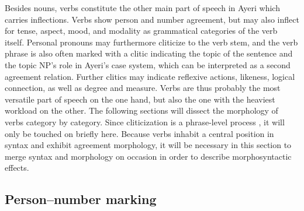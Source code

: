 Besides nouns, verbs constitute the other main part of speech in Ayeri which 
carries inflections. Verbs show person and number agreement, but may also 
inflect for tense, aspect, mood, and modality as grammatical categories of the 
verb itself. Personal pronouns may furthermore cliticize to the verb stem, and 
the verb phrase is also often marked with a clitic indicating the topic of 
the sentence and the topic NP's role in Ayeri's case system, which can be 
interpreted as a second agreement relation. Further clitics may indicate 
reflexive actions, likeness, logical connection, as well as degree and measure. 
Verbs are thus probably the most versatile part of speech on the one hand, but 
also the one with the heaviest workload on the other. The following sections 
will dissect the morphology of verbs category by category. Since cliticization 
is a phrase-level process \citep{klavans1985}, it will only be touched on 
briefly here. Because verbs inhabit a central position in syntax and exhibit 
agreement morphology, it will be necessary in this section to merge syntax and 
morphology on occasion in order to describe morphosyntactic effects.

\subsection{Person--number marking}
\label{subsec:persnumagr}

